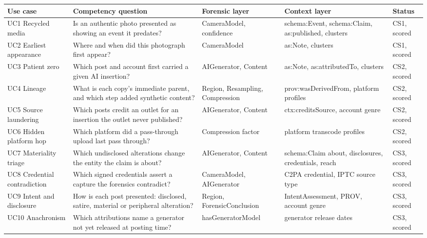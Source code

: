 \documentclass[11pt]{article}
\begin{document}
\begingroup\small
\begin{xltabular}{\linewidth}{@{}>{\raggedright\arraybackslash{}\hsize}X>{\raggedright\arraybackslash{}\hsize}X>{\raggedright\arraybackslash{}\hsize}X>{\raggedright\arraybackslash{}\hsize}X>{\raggedright\arraybackslash{}\hsize}X@{}}
\toprule
\textbf{Use case} & \textbf{Competency question} & \textbf{Forensic layer} & \textbf{Context layer} & \textbf{Status} \\
\midrule
\endhead
UC1 Recycled media & Is an authentic photo presented as showing an event it predates? & CameraModel, confidence & schema:Event, schema:Claim, as:published, clusters & CS1, scored \\
UC2 Earliest appearance & Where and when did this photograph first appear? & CameraModel & as:Note, clusters & CS1, scored \\
UC3 Patient zero & Which post and account first carried a given AI insertion? & AIGenerator, Content & as:Note, as:attributedTo, clusters & CS2, scored \\
UC4 Lineage & What is each copy's immediate parent, and which step added synthetic content? & Region, Resampling, Compression & prov:wasDerivedFrom, platform profiles & CS2, scored \\
UC5 Source laundering & Which posts credit an outlet for an insertion the outlet never published? & AIGenerator, Content & ctx:creditsSource, account genre & CS2, scored \\
UC6 Hidden platform hop & Which platform did a pass-through upload last pass through? & Compression factor & platform transcode profiles & CS2, scored \\
UC7 Materiality triage & Which undisclosed alterations change the entity the claim is about? & AIGenerator, Content & schema:Claim about, disclosures, credentials, reach & CS3, scored \\
UC8 Credential contradiction & Which signed credentials assert a capture the forensics contradict? & CameraModel, AIGenerator & C2PA credential, IPTC source type & CS3, scored \\
UC9 Intent and disclosure & How is each post presented: disclosed, satire, material or peripheral alteration? & Region, ForensicConclusion & IntentAssessment, PROV, account genre & CS3, scored \\
UC10 Anachronism & Which attributions name a generator not yet released at posting time? & hasGeneratorModel & generator release dates & CS3, scored \\

\end{xltabular}
\end{document}
